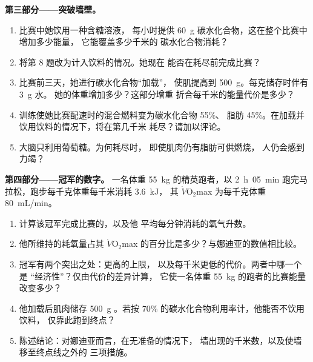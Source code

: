 \begin{problem}
\medskip
\noindent\textbf{第三部分——突破墙壁。}
\begin{enumerate}[resume]
  \item 比赛中她饮用一种含糖溶液，
        每小时提供 \qty{60}{g} 碳水化合物，这在整个比赛中增加多少能量，
        它能覆盖多少千米的
        碳水化合物消耗？
  \item 将第 8 题改为计入饮料的情况。她现在
        能否在耗尽前完成比赛？
  \item 比赛前三天，她进行碳水化合物“加载”，
        使肌提高到 \qty{500}{g}。每克储存时伴有 \qty{3}{g} 水。
        她的体重增加多少？这部分增重
        折合每千米的能量代价是多少？
  \item 训练使她比赛配速时的混合燃料变为碳水化合物 55\%、
        脂肪 45\%。在加载并饮用饮料的情况下，将在第几千米
        耗尽？请加以评论。
  \item 大脑只利用葡萄糖。为何耗尽时，
        即使肌肉仍有脂肪可供燃烧，
        人仍会感到力竭？
\end{enumerate}

\medskip
\noindent\textbf{第四部分——冠军的数字。}
一名体重 \qty{55}{kg} 的精英跑者，以 \qty{2}{h}\,
\qty{05}{min} 跑完马拉松，跑步每千克体重每千米消耗 \qty{3.6}{kJ}，
其 $\dot V\!\mathrm{O_2}$max 为每千克体重
\qty{80}{mL/min}。
\begin{enumerate}[resume]
  \item 计算该冠军完成比赛的，以及他
        平均每分钟消耗的氧气升数。
  \item 他所维持的耗氧量占其
        $\dot V\!\mathrm{O_2}$max 的百分比是多少？与娜迪亚的数值相比较。
  \item 冠军有两个突出之处：更高的上限，
        以及每千米更低的代价。两者中哪一个是
        “经济性”？仅由代价的差异计算，
        它使一名体重 \qty{55}{kg} 的跑者的比赛能量改变多少？
  \item 他加载后肌肉储存 \qty{500}{g} 。若按
        70\% 的碳水化合物利用率计，他能否不饮用饮料，
        仅靠此跑到终点？
  \item 陈述结论：对娜迪亚而言，在无准备的情况下，
        墙出现的千米数，以及使墙移至终点线之外的
        三项措施。
\end{enumerate}
\end{problem}
